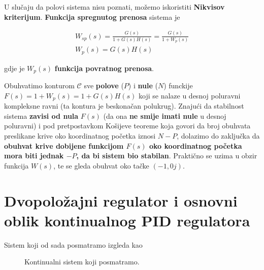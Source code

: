\documentclass[12pt]{IEEEtran}
\numberwithin{equation}{subsection}
\numberwithin{figure}{section}
\begin{document}
U slu\v{c}aju da polovi sistema nisu poznati, mo\v{z}emo iskoristiti \textbf{Nikvisov kriterijum}.
\textbf{Funkcija spregnutog prenosa} sistema je

\begin{gather}
    W_{sp}(s) = \frac{G(s)}{1 + G(s)H(s)} = \frac{G(s)}{1 + W_{p}(s)}\\
    W_{p}(s) = G(s)H(s)
\end{gather}

gdje je $W_{p}(s)$ \textbf{funkcija povratnog prenosa}.

Obuhvatimo konturom $\mathcal{C}$ sve \textbf{polove} ($P$) i \textbf{nule} ($N$)
funckije $F(s) = 1 + W_{p}(s) = 1 + G(s)H(s)$
koji se nalaze u desnoj poluravni kompleksne ravni (ta kontura je beskona\v{c}an polukrug).
Znaju\'{c}i da stabilnost sistema \textbf{zavisi od nula} $F(s)$ (da ona \textbf{ne smije imati nule} u desnoj poluravni)
i pod pretpostavkom Ko\v{s}ijeve teoreme koja
govori da broj obuhvata preslikane krive oko koordinatnog po\v{c}etka iznosi
$N - P$, dolazimo do zaklju\v{c}ka da \textbf{obuhvat krive dobijene funkcijom $F(s)$
    oko koordinatnog po\v{c}etka mora biti jednak $-P$, da bi sistem bio stabilan}.
Prakti\v{c}no se uzima u obzir funkcija $W(s)$, te se gleda obuhvat oko ta\v{c}ke
$(-1, 0j)$.

\newpage
\section{\textbf{Dvopolo\v{z}ajni regulator i osnovni oblik kontinualnog PID regulatora}}

Sistem koji od sada posmatramo izgleda kao

\begin{figure}[h]
    \centering
    \caption{Kontinualni sistem koji posmatramo.}
\end{figure}
\end{document}
